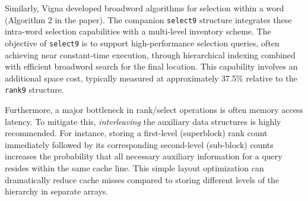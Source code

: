 Similarly, Vigna \cite{vigna2008broadword} developed broadword algorithms for selection within a word (Algorithm 2 in the paper). The companion \texttt{select9} structure integrates these intra-word selection capabilities with a multi-level inventory scheme. The objective of \texttt{select9} is to support high-performance selection queries, often achieving near constant-time execution, through hierarchical indexing combined with efficient broadword search for the final location. This capability involves an additional space cost, typically measured at approximately 37.5\% relative to the \texttt{rank9} structure.

Furthermore, a major bottleneck in rank/select operations is often memory access latency. To mitigate this, \emph{interleaving} the auxiliary data structures is highly recommended. For instance, storing a first-level (superblock) rank count immediately followed by its corresponding second-level (sub-block) counts increases the probability that all necessary auxiliary information for a query resides within the same cache line. This simple layout optimization can dramatically reduce cache misses compared to storing different levels of the hierarchy in separate arrays.
